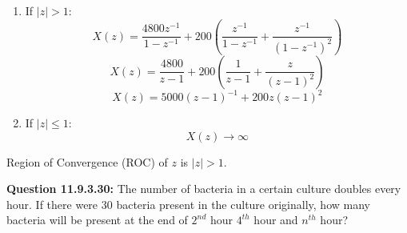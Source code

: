 \documentclass[journal,12pt,twocolumn]{IEEEtran}
\theoremstyle{remark}
\begin{document}
\begin{enumerate}
\begin{enumerate}
\item If $|z| > 1$:
\[X(z) = \frac{4800z^{-1}}{1 - z^{-1}} + 200(\frac{z^{-1}}{1 - z^{-1}} + \frac{z^{-1}}{(1-z^{-1})^2})\]
\[X(z) = \frac{4800}{z-1} + 200(\frac{1}{z-1} + \frac{z}{(z - 1)^2})\]
\[{X(z) = 5000(z - 1)^{-1} + 200z(z-1)^2}\]

\item If $|z| \le 1$:
\[X(z) \to \infty\]

\end{enumerate}

Region of Convergence (ROC) of $z$ is $|z| > 1$.

\end{enumerate}

\vspace{1cm}
\textbf{Question 11.9.3.30:} The number of bacteria in a certain culture doubles every hour. If there were 30 bacteria present in the culture originally, how many bacteria will be present at the end of $2^{nd}$ hour $4^{th}$ hour and $n^{th}$ hour?
\\
\solution
\end{document}
